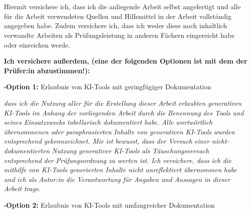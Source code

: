 %
%
%
%

\chapter*{\chapHeadingDeclaration}

\fontsize{10}{10}\selectfont

Hiermit versichere ich, dass ich die anliegende Arbeit selbst angefertigt und alle für die Arbeit verwendeten Quellen und Hilfsmittel in der Arbeit vollständig angegeben habe.
Zudem versichere ich, dass ich weder diese noch inhaltlich verwandte Arbeiten als Prüfungsleistung in anderen Fächern eingereicht habe oder einreichen werde.

\textbf{Ich versichere außerdem, (eine der folgenden Optionen ist mit dem \/ der Prüfer:in abzustimmen!):}


$\square$\hspace{3em}\textbf{Option 1:} Erlaubnis von KI-Tools mit geringfügiger Dokumentation

\textit{%
	dass ich die Nutzung aller für die Erstellung dieser Arbeit erlaubten generativen KI-Tools im Anhang der vorliegenden Arbeit durch die Benennung des Tools und seines Einsatzzwecks tabellarisch dokumentiert habe.
	Alle wortwörtlich übernommenen oder paraphrasierten Inhalte von generativen KI-Tools wurden entsprechend gekennzeichnet.
	Mir ist bewusst, dass der Versuch einer nicht-dokumentierten Nutzung generativer KI-Tools als Täuschungsversuch entsprechend der Prüfungsordnung zu werten ist.
	Ich versichere, dass ich die mithilfe von KI-Tools generierten Inhalte nicht unreflektiert übernommen habe und ich als Autor:in die Verantwortung für Angaben und Aussagen in dieser Arbeit trage.
}

\vspace{0.5\baselineskip}

$\square$\hspace{3em}\textbf{Option 2:} Erlaubnis von KI-Tools mit umfangreicher Dokumentation

